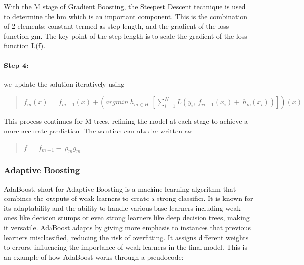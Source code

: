 With the M stage of Gradient Boosting, the Steepest Descent technique is used to determine the  hm which is an important component. This is the combination of 2 elements: constant termed as step length, and the gradient of the loss function gm. The key point of the step length is to scale the gradient of the loss function L(f). 

\paragraph*{Step 4:} we update the solution iteratively using 
\begin{quote}
    \(f_{m}(x) = \ f_{m - 1}(x) + \left( argmin\ h_{m \in H}\ \ \left\lbrack \sum_{i=1}^{N}L\left( y_{i},\ f_{m - 1}\left( x_{i} \right) + \ h_{m}\left( x_{i} \right) \right) \right\rbrack \right)(x)\)
    
\end{quote}
This process continues for M trees, refining the model at each stage to achieve a more accurate prediction. The solution can also be written as:
\begin{quote}
    \(f_{} = \ f_{m - 1} - \ \rho_{m}g_{m}\)

\end{quote}


\subsubsection{Adaptive Boosting}
AdaBoost, short for Adaptive Boosting is a machine learning algorithm that combines the outputs of weak learners to create a strong classifier. It is known for its adaptability and the ability to handle various base learners including weak ones like decision stumps or even strong learners like deep decision trees, making it versatile. AdaBoost adapts by giving more emphasis to instances that previous learners misclassified, reducing the risk of overfitting. It assigns different weights to errors, influencing the importance of weak learners in the final model. 
This is an example of how AdaBoost works through a pseudocode: 

